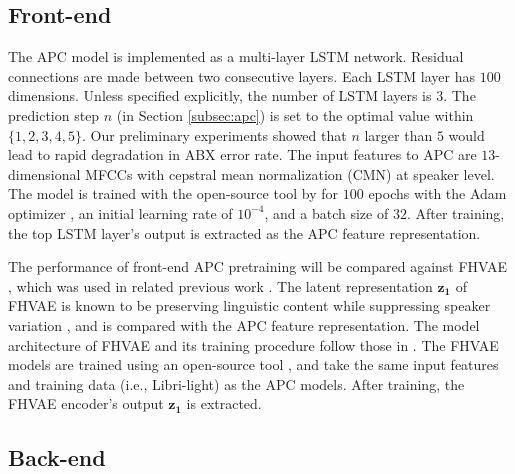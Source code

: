 \documentclass[a4paper]{article}
\begin{document}
\subsection{Front-end}
\label{subsec:exp_setup_apc_fhvae}
The APC model is implemented as a  multi-layer  LSTM network. Residual connections are made between two consecutive layers.  
Each LSTM layer has $100$ dimensions.
Unless specified explicitly, the number of LSTM layers is $3$.
The prediction step $n$ (in Section \ref{subsec:apc}) is set to  the optimal value within $\{1,2,3,4,5\}$. Our preliminary experiments showed that $n$ larger than $5$ would lead to rapid degradation in ABX error rate. 
The input features to APC are $13$-dimensional MFCCs with cepstral mean normalization (CMN) at speaker level. 
The model is trained with the open-source tool by \cite{Chung2019} for $100$ epochs with the Adam optimizer \cite{kingma2014adam}, an initial learning rate of $10^{-4}$, and a batch size of $32$. 
After training, the top LSTM layer's output is extracted as the APC feature representation.

The performance of front-end  APC pretraining will be compared against FHVAE \cite{hsu2017nips}, which was used in related previous work \cite{Feng2019improving}. 
The latent representation $\bm{z_1}$ of FHVAE is known to be preserving linguistic content while suppressing speaker variation \cite{hsu2017nips}, and is compared with the APC feature representation. The model architecture of FHVAE and its training procedure follow those in \cite{Feng2019improving}.
The FHVAE models are trained 
using an open-source tool \cite{hsu2017nips}, and take the same input features and training data (i.e., Libri-light) as the APC models. After training, the  FHVAE encoder's output $\bm{z_1}$ is extracted.
\subsection{Back-end}
\end{document}
